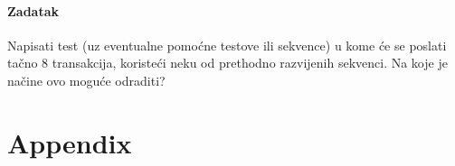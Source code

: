 \paragraph{Zadatak}

Napisati test (uz eventualne pomoćne testove ili sekvence) u kome će se poslati
tačno 8 transakcija, koristeći neku od prethodno razvijenih sekvenci. Na koje je
načine ovo moguće odraditi?


\section{Appendix}




















